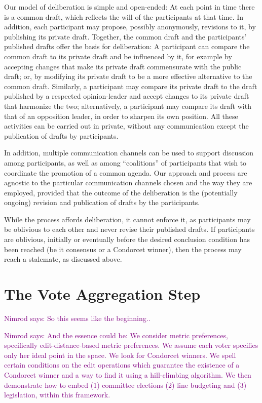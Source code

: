 \documentclass[sigconf]{aamas}  %
\newcommand{\nimrod}[1]{\textcolor{purple}{Nimrod says: #1}}
\begin{document}
Our model of deliberation is simple and open-ended:  At each point in time there is a common draft, which reflects the will of the participants at that time.  In addition, each participant may propose, possibly anonymously, revisions to it, by publishing its private draft. Together, the common draft and the participants' published drafts offer the basis for deliberation:  A participant can compare the common draft to its private draft and be influenced by it, for example by accepting changes that make its private draft commensurate with the public draft; or, by modifying its private draft to be a more effective alternative to the common draft.  Similarly, a participant may compare its private draft to the draft published by a respected opinion-leader and accept changes to its private draft that harmonize the two; alternatively, a participant may compare its draft with that of an opposition leader, in order to sharpen its own position.  All these activities can be carried out in private, without any communication except the publication of drafts by participants.

In addition, multiple communication channels can be used to support discussion among participants, as well as among ``coalitions'' of participants that wish to coordinate the promotion of a common agenda.  Our approach and process are agnostic to the particular communication channels chosen and the way they are employed, provided that the outcome of the deliberation is the (potentially ongoing) revision and publication of drafts by the participants.

While the process affords deliberation, it cannot enforce it, as participants may be oblivious to each other and never revise their published drafts. If participants are oblivious, initially or eventually before the desired conclusion condition has been reached (be it consensus or a Condorcet winner), then the process may reach a stalemate, as discussed above.


\section{The Vote Aggregation Step}
\label{section:voting step}

\nimrod{So this seems like the beginning..}

\nimrod{And the essence could be: We consider metric preferences, specifically edit-distance-based metric preferences. We assume each voter specifies only her ideal point in the space. We look for Condorcet winners. We spell certain conditions on the edit operations which guarantee the existence of a Condorcet winner and a way to find it using a hill-climbing algorithm. We then demonstrate how to embed (1) committee elections (2) line budgeting and (3) legislation, within this framework.}
\end{document}
